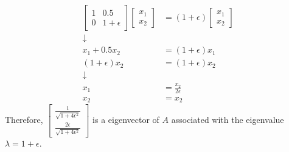 \documentclass[letter, 11pt]{article}
\begin{document}
\begin{enumerate}[wide = 0pt, label = \textbf{Problem \arabic*:}]
\begin{enumerate}
			\begin{align*}
				\begin{bmatrix}
				1 & 0.5 \\
				0 & 1 + \epsilon
				\end{bmatrix}
				\begin{bmatrix}
				x_1 \\ x_2
				\end{bmatrix}
				&= 
				(1 + \epsilon)
				\begin{bmatrix}
				x_1 \\ x_2
				\end{bmatrix}
				\\ \downarrow \\
				x_1 + 0.5x_2 &= (1 + \epsilon) x_1 \\
				(1 + \epsilon) x_2 &= (1 + \epsilon) x_2 
				\\ \downarrow \\
				x_1 &= \frac{x_2}{2 \epsilon}\\
				x_2 &= x_2
			\end{align*}
			Therefore, $ \begin{bmatrix} \frac{1}{\sqrt{1 + 4 \epsilon^2}} \\ \frac{2 \epsilon}{\sqrt{1 + 4 \epsilon^2}} \end{bmatrix} $ is a eigenvector of $ A $ associated with the eigenvalue $ \lambda = 1 + \epsilon $. \\
			

\end{enumerate}
\end{enumerate}
\end{document}
